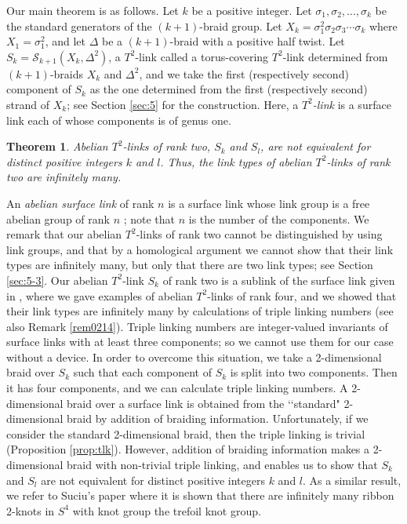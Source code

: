 \documentclass[a4paper,11pt]{amsart}
\numberwithin{equation}{section}
\newtheorem{theorem}{Theorem}[section]
\begin{document}
\begin{sloppypar}
Our main theorem is as follows. Let $k$ be a positive integer. Let $\sigma_1, \sigma_2, \ldots, \sigma_k$ be the standard generators of the $(k+1)$-braid group. Let $X_k=\sigma_1^2 \sigma_2 \sigma_3 \cdots \sigma_k$ where $X_1=\sigma_1^2$, and let $\Delta$ be a $(k+1)$-braid with a positive half twist. 
Let $S_k=\mathcal{S}_{k+1}(X_k, \Delta^2)$, a $T^2$-link called a torus-covering $T^2$-link determined from $(k+1)$-braids $X_k$ and $\Delta^2$, and we take the first (respectively second) component of $S_k$ as the one determined from the first (respectively second) strand of $X_k$; see Section \ref{sec:5} for the construction. Here, a {\it $T^2$-link} is a surface link each of whose components is of genus one.   
\begin{theorem}\label{mainthm}
Abelian $T^2$-links of rank two, $S_k$ and $S_l$, are not equivalent for distinct positive integers $k$ and $l$. Thus, the link types of abelian $T^2$-links of rank two are infinitely many. 
\end{theorem}
An {\it abelian surface link} of rank $n$ is a surface link whose link group is a free abelian group of rank $n$ \cite{I-N}; note that $n$ is the number of the components. 
We remark that our abelian $T^2$-links of rank two cannot be distinguished by using link groups, and that by a homological argument we cannot show that their link types are infinitely many, but only that there are two link types; see Section \ref{sec:5-3}.
Our abelian $T^2$-link $S_k$ of rank two is a sublink of the surface link given in \cite{I-N}, where we gave examples of abelian $T^2$-links of rank four, and we showed that their link types are infinitely many by calculations of triple linking numbers (see also Remark \ref{rem0214}). Triple linking numbers are integer-valued invariants of surface links with at least three components; so we cannot use them for our case without a device. 
In order to overcome this situation, we take a 2-dimensional braid over $S_k$ such that each component of $S_k$ is split into two components. Then it has four components, and we can calculate triple linking numbers. A 2-dimensional braid over a surface link is obtained from the \lq\lq standard" 2-dimensional braid by addition of braiding information. Unfortunately, if we consider the standard 2-dimensional braid, then the triple linking is trivial (Proposition \ref{prop:tlk}). However, addition of braiding information makes a 2-dimensional braid with non-trivial triple linking, and enables us to show that $S_k$ and $S_l$ are not equivalent for distinct positive integers $k$ and $l$. As a similar result, we refer to Suciu's paper \cite{Suciu} where it is shown that there are infinitely many ribbon 2-knots in $S^4$ with knot group the trefoil knot group. 
\end{sloppypar}
\end{document}

